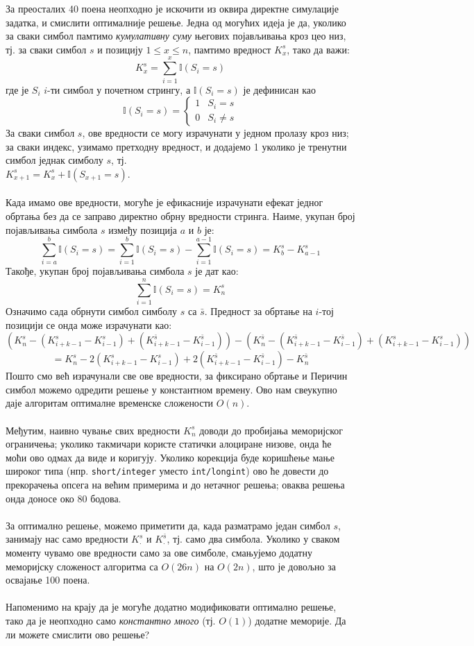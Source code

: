 \documentclass[a4wide]{article}
\begin{document}
За преосталих 40 поена неопходно је искочити из оквира директне симулације задатка, и смислити оптималније решење. Једна од могућих идеја је да, уколико за сваки симбол памтимо \emph{кумулативну суму} његових појављивања кроз цео низ, тј. за сваки симбол $s$ и позицију $1 \leq x \leq n$, памтимо вредност $K_x^s$, тако да важи:
\[K_x^s = \sum_{i=1}^x {\mathbb{I}(S_i = s)}\]
где је $S_i$ $i$-ти симбол у почетном стрингу, а $\mathbb{I}(S_i = s)$ је дефинисан као
\[\mathbb{I}(S_i = s) = \begin{cases}
	1 & S_i = s\\
	0 & S_i \neq s
 \end{cases}\]
За сваки симбол $s$, ове вредности се могу израчунати у једном пролазу кроз низ; за сваки индекс, узимамо претходну вредност, и додајемо 1 уколико је тренутни симбол једнак симболу $s$, тј. \\$K_{x+1}^s = K_{x}^s + \mathbb{I}(S_{x+1} = s)$.\\ \\
Када имамо ове вредности, могуће је ефикасније израчунати ефекат једног обртања без да се заправо директно обрну вредности стринга. Наиме, укупан број појављивања симбола $s$ између позиција $a$ и $b$ је:
\[\sum_{i=a}^{b} {\mathbb{I}(S_i = s)} = \sum_{i=1}^{b} {\mathbb{I}(S_i = s)} - \sum_{i=1}^{a-1} {\mathbb{I}(S_i = s)} = K_b^s - K_{a-1}^s\]
Такође, укупан број појављивања симбола $s$ је дат као:
\[\sum_{i=1}^{n} {\mathbb{I}(S_i = s)} = K_n^s\]
Означимо сада обрнути симбол симболу $s$ са $\bar{s}$. Предност за обртање на $i$-тој позицији се онда може израчунати као:
\[(K_n^s - (K_{i+k-1}^s - K_{i-1}^s) + (K_{i+k-1}^{\bar{s}} - K_{i-1}^{\bar{s}})) - (K_n^{\bar{s}} - (K_{i+k-1}^{\bar{s}} - K_{i-1}^{\bar{s}}) + (K_{i+k-1}^{s} - K_{i-1}^{s}))\]
\[= K_n^s - 2(K_{i+k-1}^s - K_{i-1}^s) + 2(K_{i+k-1}^{\bar{s}} - K_{i-1}^{\bar{s}}) - K_n^{\bar{s}}\]
Пошто смо већ израчунали све ове вредности, за фиксирано обртање и Перичин симбол можемо одредити решење у константном времену. Ово нам свеукупно даје алгоритам оптималне временске сложености $O(n)$.\\ \\
Међутим, наивно чување свих вредности $K_n^s$ доводи до пробијања меморијског ограничења; уколико такмичари користе статички алоциране низове, онда ће моћи ово одмах да виде и коригују. Уколико корекција буде коришћење мање широког типа (нпр. {\tt short/integer} уместо {\tt int/longint}) ово ће довести до прекорачења опсега на већим примерима и до нетачног решења; оваква решења онда доносе око 80 бодова.\\ \\
За оптимално решење, можемо приметити да, када разматрамо један симбол $s$, занимају нас само вредности $K_{\cdot}^s$ и $K_{\cdot}^{\bar{s}}$, тј. само два симбола. Уколико у сваком моменту чувамо ове вредности само за ове симболе, смањујемо додатну меморијску сложеност алгоритма са $O(26n)$ на $O(2n)$, што је довољно за освајање 100 поена.\\ \\
Напоменимо на крају да је могуће додатно модификовати оптимално решење, тако да је неопходно само \emph{константно много} (тј. $O(1)$) додатне меморије. Да ли можете смислити ово решење?
\end{document}
